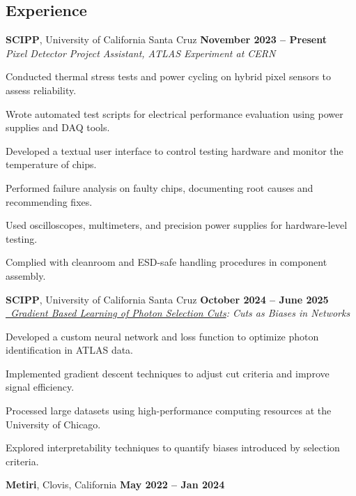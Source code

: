 \documentclass[margin,line]{resume}
\let\origsection\section%
\let\section\subsection%
\let\section\origsection%
\begin{document}
\begin{resume}
\section{\mysidestyle Experience}

\textbf{SCIPP}, University of California Santa Cruz \hfill \textbf{November 2023 -- Present}\\
\textsl{Pixel Detector Project Assistant, ATLAS Experiment at CERN}
\begin{list2}
\item Conducted thermal stress tests and power cycling on hybrid pixel sensors to assess reliability.
\item Wrote automated test scripts for electrical performance evaluation using power supplies and DAQ tools.
\item Developed a textual user interface to control testing hardware and monitor the temperature of chips. 
\item Performed failure analysis on faulty chips, documenting root causes and recommending fixes.
\item Used oscilloscopes, multimeters, and precision power supplies for hardware-level testing.
\item Complied with cleanroom and ESD-safe handling procedures in component assembly.
\end{list2}
\textbf{SCIPP}, University of California Santa Cruz \hfill \textbf{October 2024 -- June 2025}\\
\textsl{\href{https://github.com/ScottieJPhillips/Gradient-Based-Learning-of-Photon-Selection-Cuts}{~Gradient Based Learning of Photon Selection Cuts}: Cuts as Biases in Networks}
\begin{list2}
  \item Developed a custom neural network and loss function to optimize photon identification in ATLAS data.
  \item Implemented gradient descent techniques to adjust cut criteria and improve signal efficiency.
  \item Processed large datasets using high-performance computing resources at the University of Chicago.
  \item Explored interpretability techniques to quantify biases introduced by selection criteria.
\end{list2}
{{\textbf{Metiri}}}, Clovis, California \hfill \textbf{May 2022 -- Jan 2024}\\

\end{resume}
\end{document}
